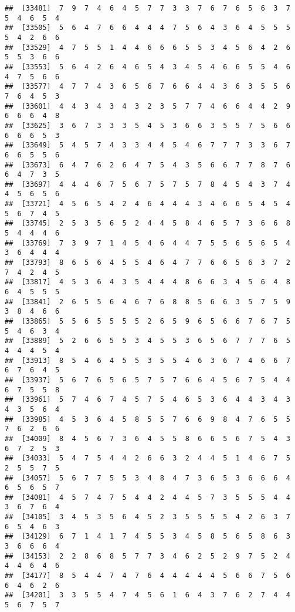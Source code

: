 \documentclass[
]{book}
\begin{document}
\begin{verbatim}
##  [33481]  7  9  7  4  6  4  5  7  7  3  3  7  6  7  6  5  6  3  7  5  4  6  5  4
##  [33505]  5  6  4  7  6  6  4  4  4  7  5  6  4  3  6  4  5  5  5  5  4  2  6  6
##  [33529]  4  7  5  5  1  4  4  6  6  6  5  5  3  4  5  6  4  2  6  5  5  3  6  6
##  [33553]  5  6  4  2  6  4  6  5  4  3  4  5  4  6  6  5  5  4  6  4  7  5  6  6
##  [33577]  4  7  7  4  3  6  5  6  7  6  6  4  4  3  6  3  5  5  6  7  6  4  5  3
##  [33601]  4  4  3  4  3  4  3  2  3  5  7  7  4  6  6  4  4  2  9  6  6  6  4  8
##  [33625]  3  6  7  3  3  3  5  4  5  3  6  6  3  5  5  7  5  6  6  6  6  6  5  3
##  [33649]  5  4  5  7  4  3  3  4  4  5  4  6  7  7  7  3  3  6  7  6  6  5  5  6
##  [33673]  6  4  7  6  2  6  4  7  5  4  3  5  6  6  7  7  8  7  6  6  4  7  3  5
##  [33697]  4  4  4  6  7  5  6  7  5  7  5  7  8  4  5  4  3  7  4  4  5  6  5  6
##  [33721]  4  5  6  5  4  2  4  6  4  4  4  3  4  6  6  5  4  5  4  5  6  7  4  5
##  [33745]  2  5  3  5  6  5  2  4  4  5  8  4  6  5  7  3  6  6  8  5  4  4  4  6
##  [33769]  7  3  9  7  1  4  5  4  6  4  4  7  5  5  6  5  6  5  4  3  6  4  4  4
##  [33793]  8  6  5  6  4  5  5  4  6  4  7  7  6  6  5  6  3  7  2  7  4  2  4  5
##  [33817]  4  5  3  6  4  3  5  4  4  4  8  6  6  3  4  5  6  4  8  6  4  5  5  5
##  [33841]  2  6  5  5  6  4  6  7  6  8  8  5  6  6  3  5  7  5  9  3  8  4  6  6
##  [33865]  5  5  6  5  5  5  5  2  6  5  9  6  5  6  6  7  6  7  5  5  4  6  3  4
##  [33889]  5  2  6  6  5  5  3  4  5  5  3  6  5  6  7  7  7  6  5  4  4  4  5  4
##  [33913]  8  5  4  6  4  5  5  3  5  5  4  6  3  6  7  4  6  6  7  6  7  6  4  5
##  [33937]  5  6  7  6  5  6  5  7  5  7  6  6  4  5  6  7  5  4  4  6  7  5  5  8
##  [33961]  5  7  4  6  7  4  5  7  5  4  6  5  3  6  4  4  3  4  3  4  3  5  6  4
##  [33985]  4  5  3  6  4  5  8  5  5  7  6  6  9  8  4  7  6  5  5  7  6  2  6  6
##  [34009]  8  4  5  6  7  3  6  4  5  5  8  6  6  5  6  7  5  4  3  6  7  2  5  3
##  [34033]  5  4  7  5  4  4  2  6  6  3  2  4  4  5  1  4  6  7  5  2  5  5  7  5
##  [34057]  5  6  7  7  5  5  3  4  8  4  7  3  6  5  3  6  6  6  4  6  5  6  5  7
##  [34081]  4  5  7  4  7  5  4  4  2  4  4  5  7  3  5  5  5  4  4  3  6  7  6  4
##  [34105]  3  4  5  3  5  6  4  5  2  3  5  5  5  5  4  2  6  3  7  6  5  4  6  3
##  [34129]  6  7  1  4  1  7  4  5  5  3  4  5  8  5  6  5  8  6  3  3  6  6  6  4
##  [34153]  2  2  8  6  8  5  7  7  3  4  6  2  5  2  9  7  5  2  4  4  4  6  4  6
##  [34177]  8  5  4  4  7  4  7  6  4  4  4  4  4  5  6  6  7  5  6  6  4  6  2  6
##  [34201]  3  3  5  5  4  7  4  5  6  1  6  4  3  7  6  2  7  4  4  5  6  7  5  7

\end{verbatim}
\end{document}
